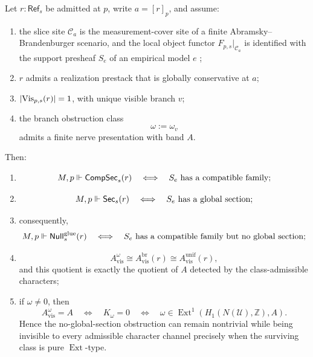 \begin{proposition}\label{thm:unique-branch-contextuality-comparison}
Let $r:\mathsf{Ref}_s$ be admitted at $p$, write $a=[r]_p$, and assume:
\begin{enumerate}[label=(\roman*),nosep]
\item the slice site $\mathcal C_a$ is the measurement-cover site of a finite Abramsky--Brandenburger scenario, and the local object functor $F_{p,s}|_{\mathcal C_a}$ is identified with the support presheaf $S_e$ of an empirical model $e$ \cite{AbramskyBrandenburger2011};
\item $r$ admits a realization prestack that is globally conservative at $a$;
\item $|\mathrm{Vis}_{p,s}(r)|=1$, with unique visible branch $v$;
\item the branch obstruction class
\[
\omega:=\omega_v
\]
admits a finite nerve presentation with band $A$.
\end{enumerate}
Then:
\begin{enumerate}[label=(\roman*),nosep]
\item
\[
M,p\Vdash \mathsf{CompSec}_s(r)
\quad\Longleftrightarrow\quad
S_e\ \text{has a compatible family};
\]
\item
\[
M,p\Vdash \mathsf{Sec}_s(r)
\quad\Longleftrightarrow\quad
S_e\ \text{has a global section};
\]
\item consequently,
\[
M,p\Vdash \mathsf{Null}^{\mathrm{glue}}_s(r)
\quad\Longleftrightarrow\quad
S_e\ \text{has a compatible family but no global section};
\]
\item
\[
A_{\mathrm{vis}}^{\omega}
\cong
A_{\mathrm{vis}}^{\mathrm{br}}(r)
\cong
A_{\mathrm{vis}}^{\mathrm{unif}}(r),
\]
and this quotient is exactly the quotient of $A$ detected by the class-admissible characters;
\item if $\omega\neq 0$, then
\[
A_{\mathrm{vis}}^{\omega}=A
\quad\Longleftrightarrow\quad
K_{\omega}=0
\quad\Longleftrightarrow\quad
\omega\in \operatorname{Ext}^1(H_1(N(\mathcal U),\mathbb Z),A).
\]
Hence the no-global-section obstruction can remain nontrivial while being invisible to every admissible character channel precisely when the surviving class is pure $\operatorname{Ext}$-type.
\end{enumerate}
\end{proposition}

